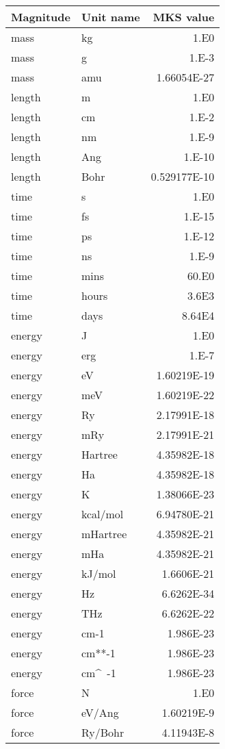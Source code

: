 \begin{center}
\begin{tabular}{llr}
Magnitude & Unit name & MKS value \\
\hline
mass     & kg         & 1.E0 \\
mass     & g          & 1.E-3 \\
mass     & amu        & 1.66054E-27 \\
length   & m          & 1.E0 \\
length   & cm         & 1.E-2 \\
length   & nm         & 1.E-9 \\
length   & Ang        & 1.E-10 \\
length   & Bohr       & 0.529177E-10 \\
time     & s          & 1.E0 \\
time     & fs         & 1.E-15 \\
time     & ps         & 1.E-12 \\
time     & ns         & 1.E-9 \\
time     & mins       & 60.E0 \\
time     & hours      & 3.6E3 \\
time     & days       & 8.64E4 \\
energy   & J          & 1.E0 \\
energy   & erg        & 1.E-7 \\
energy   & eV         & 1.60219E-19 \\
energy   & meV        & 1.60219E-22 \\
energy   & Ry         & 2.17991E-18 \\
energy   & mRy        & 2.17991E-21 \\
energy   & Hartree    & 4.35982E-18 \\
energy   & Ha         & 4.35982E-18 \\
energy   & K          & 1.38066E-23 \\
energy   & kcal/mol   & 6.94780E-21 \\
energy   & mHartree   & 4.35982E-21 \\
energy   & mHa        & 4.35982E-21 \\
energy   & kJ/mol     & 1.6606E-21 \\
energy   & Hz         & 6.6262E-34 \\
energy   & THz        & 6.6262E-22 \\
energy   & cm-1       & 1.986E-23 \\
energy   & cm**-1     & 1.986E-23 \\
energy   & cm\^~-1      & 1.986E-23 \\
force    & N          & 1.E0 \\
force    & eV/Ang     & 1.60219E-9 \\
force    & Ry/Bohr    & 4.11943E-8 \\
\hline
\end{tabular}


\end{center}
